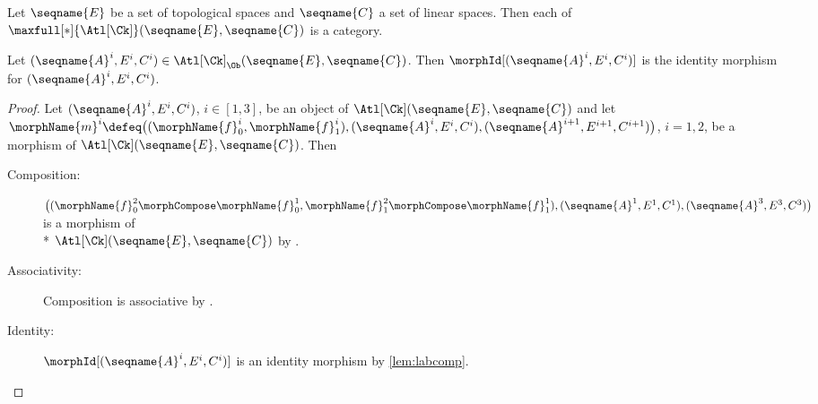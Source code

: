 \documentclass{article}
\begin{document}
\begin{lemma}
\label{lem:Ck-ATLiscat}
Let $\seqname{E}$ be a set of topological spaces and $\seqname{C}$ a set
of linear spaces. Then each of
$\maxfull[*]{\Atl[\Ck]}(\seqname{E}, \seqname{C})$ is a category.

Let
$
  (\seqname{A}^i, E^i, C^i)
  \in
  \Atl[\Ck]_\Ob(\seqname{E}, \seqname{C})
$.
Then $\morphId[{{(\seqname{A}^i, E^i, C^i)}}]$ is the
identity morphism for $(\seqname{A}^i, E^i, C^i)$.

\begin{proof}
Let $(\seqname{A}^i,E^i,C^i)$, $i \in [1,3]$,
be an object of $\Atl[\Ck](\seqname{E}, \seqname{C})$ and
let
$
  \morphName{m}^i \defeq \\
  \bigl (
    (\morphName{f}_0^i,\morphName{f}_1^i),
    (\seqname{A}^i,E^i,C^i),
    (\seqname{A}^{i+1},E^{i+1},C^{i+1})
  \bigr )
$, $i=1,2$,
be a morphism of $\Atl[\Ck](\seqname{E}, \seqname{C})$. Then
\begin{description}
\item[Composition:]
$
  \bigl (
    (
      \morphName{f}_0^2 \morphCompose \morphName{f}_0^1,
      \morphName{f}_1^2 \morphCompose \morphName{f}_1^1
    ),
    (\seqname{A}^1,E^1,C^1),
    (\seqname{A}^3,E^3,C^3)
  \bigr )
$
is a morphism of \\*
$\Atl[\Ck](\seqname{E}, \seqname{C})$ by
.

\item[Associativity:]
Composition is associative by .

\item[Identity:]
$\morphId[{{(\seqname{A}^i, E^i, C^i)}}]$ is an identity
morphism by \cref{lem:labcomp}.
\end{description}
\end{proof}
\end{lemma}
\end{document}
